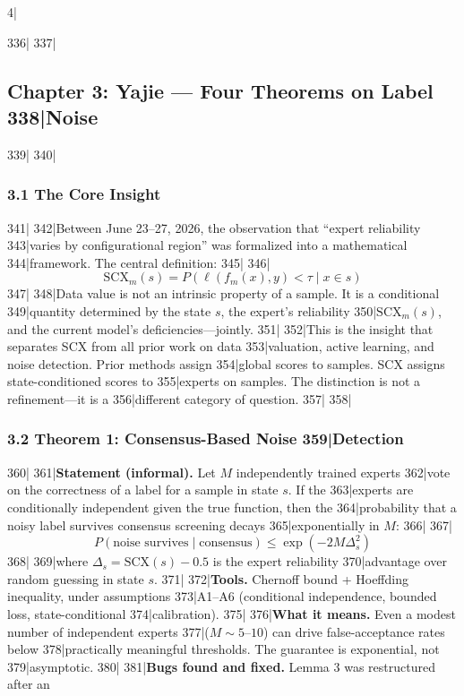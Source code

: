 4|\documentclass[
5|  12pt,
6|]{ctexart}
\begin{document}
336|
337|\subsection{Chapter 3: Yajie --- Four Theorems on Label
338|Noise}\label{chapter-3-yajie-four-theorems-on-label-noise}
339|
340|\subsubsection{3.1 The Core Insight}\label{the-core-insight}
341|
342|Between June 23--27, 2026, the observation that ``expert reliability
343|varies by configurational region'' was formalized into a mathematical
344|framework. The central definition:
345|
346|\[{\text{SCX}}_m(s) = P(\ell(f_m(x), y) < \tau \mid x \in s)\]
347|
348|Data value is not an intrinsic property of a sample. It is a conditional
349|quantity determined by the state \(s\), the expert's reliability
350|\({\text{SCX}}_m(s)\), and the current model's deficiencies---jointly.
351|
352|This is the insight that separates SCX from all prior work on data
353|valuation, active learning, and noise detection. Prior methods assign
354|global scores to samples. SCX assigns state-conditioned scores to
355|experts on samples. The distinction is not a refinement---it is a
356|different category of question.
357|
358|\subsubsection{3.2 Theorem 1: Consensus-Based Noise
359|Detection}\label{theorem-1-consensus-based-noise-detection}
360|
361|\textbf{Statement (informal).} Let \(M\) independently trained experts
362|vote on the correctness of a label for a sample in state \(s\). If the
363|experts are conditionally independent given the true function, then the
364|probability that a noisy label survives consensus screening decays
365|exponentially in \(M\):
366|
367|\[P(\text{noise survives} \mid {\text{consensus}}) \leq \exp(-2M\Delta_s^2)\]
368|
369|where \(\Delta_s = {\text{SCX}}(s) - 0.5\) is the expert reliability
370|advantage over random guessing in state \(s\).
371|
372|\textbf{Tools.} Chernoff bound + Hoeffding inequality, under assumptions
373|A1--A6 (conditional independence, bounded loss, state-conditional
374|calibration).
375|
376|\textbf{What it means.} Even a modest number of independent experts
377|(\(M \sim 5\)--\(10\)) can drive false-acceptance rates below
378|practically meaningful thresholds. The guarantee is exponential, not
379|asymptotic.
380|
381|\textbf{Bugs found and fixed.} Lemma 3 was restructured after an
\end{document}
